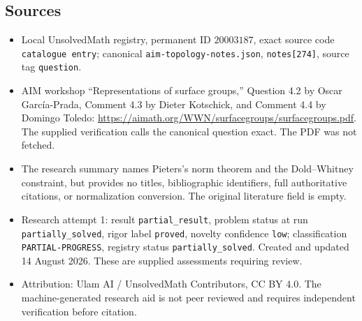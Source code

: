 \documentclass[11pt]{article}
\begin{document}
\subsection{Sources}
\begin{itemize}
\item Local UnsolvedMath registry, permanent ID \(20003187\), exact source code \texttt{catalogue entry}; canonical \texttt{aim-topology-notes.json}, \texttt{notes[274]}, source tag \texttt{question}.
\item AIM workshop ``Representations of surface groups,'' Question 4.2 by Oscar Garc\'ia-Prada, Comment 4.3 by Dieter Kotschick, and Comment 4.4 by Domingo Toledo: \url{https://aimath.org/WWN/surfacegroups/surfacegroups.pdf}. The supplied verification calls the canonical question exact. The PDF was not fetched.
\item The research summary names Pieters's norm theorem and the Dold--Whitney constraint, but provides no titles, bibliographic identifiers, full authoritative citations, or normalization conversion. The original literature field is empty.
\item Research attempt 1: result \texttt{partial\_result}, problem status at run \texttt{partially\_solved}, rigor label \texttt{proved}, novelty confidence \texttt{low}; classification \texttt{PARTIAL-PROGRESS}, registry status \texttt{partially\_solved}. Created and updated 14 August 2026. These are supplied assessments requiring review.
\item Attribution: Ulam AI / UnsolvedMath Contributors, CC BY 4.0. The machine-generated research aid is not peer reviewed and requires independent verification before citation.
\end{itemize}
\end{document}
